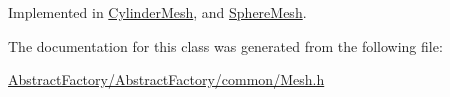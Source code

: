 Implemented in \mbox{\hyperlink{class_cylinder_mesh_aa5edae04a31b3ccab1e051eba25781a7}{Cylinder\+Mesh}}, and \mbox{\hyperlink{class_sphere_mesh_ad40fa08f33e72acf0410c2ce6099ca4c}{Sphere\+Mesh}}.



The documentation for this class was generated from the following file\+:\begin{DoxyCompactItemize}
\item 
\mbox{\hyperlink{_abstract_factory_2_abstract_factory_2common_2_mesh_8h}{Abstract\+Factory/\+Abstract\+Factory/common/\+Mesh.\+h}}\end{DoxyCompactItemize}
